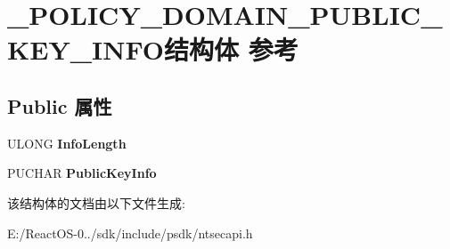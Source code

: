 \hypertarget{struct___p_o_l_i_c_y___d_o_m_a_i_n___p_u_b_l_i_c___k_e_y___i_n_f_o}{}\section{\+\_\+\+P\+O\+L\+I\+C\+Y\+\_\+\+D\+O\+M\+A\+I\+N\+\_\+\+P\+U\+B\+L\+I\+C\+\_\+\+K\+E\+Y\+\_\+\+I\+N\+F\+O结构体 参考}
\label{struct___p_o_l_i_c_y___d_o_m_a_i_n___p_u_b_l_i_c___k_e_y___i_n_f_o}
\subsection*{Public 属性}
\begin{DoxyCompactItemize}
\item 
\mbox{\label{struct___p_o_l_i_c_y___d_o_m_a_i_n___p_u_b_l_i_c___k_e_y___i_n_f_o_a43322d4497b42a99ebf89155068c6b06}} 
U\+L\+O\+NG {\bfseries Info\+Length}
\item 
\mbox{\label{struct___p_o_l_i_c_y___d_o_m_a_i_n___p_u_b_l_i_c___k_e_y___i_n_f_o_a4866f54819a5efba82e655b06177827f}} 
P\+U\+C\+H\+AR {\bfseries Public\+Key\+Info}
\end{DoxyCompactItemize}


该结构体的文档由以下文件生成\+:\begin{DoxyCompactItemize}
\item 
E\+:/\+React\+O\+S-\/0../sdk/include/psdk/ntsecapi.\+h\end{DoxyCompactItemize}
